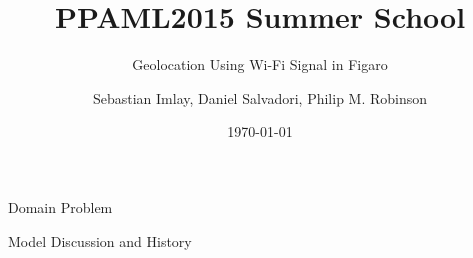 \documentclass[11pt]{beamer}
\begin{document}
\title{PPAML2015 Summer School}

\subtitle{Geolocation Using Wi-Fi Signal in Figaro}

\author{Sebastian Imlay, Daniel Salvadori, Philip M. Robinson}


\date{\today}

\begin{frame}
  \titlepage
\end{frame}


\begin{frame}{Domain Problem}

\end{frame}

\begin{frame}{Model Discussion and History}

\end{frame}
\end{document}
